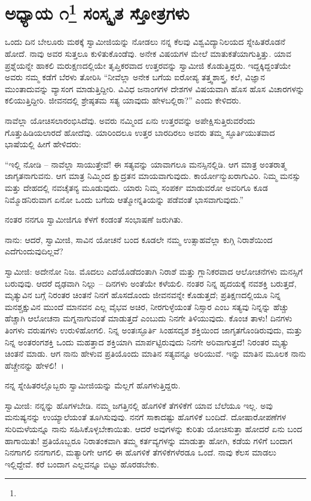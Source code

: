 
\chapter[ಅಧ್ಯಾಯ ೧]{ಅಧ್ಯಾಯ ೧\protect\footnote{} ಸಂಸ್ಕೃತ ಸ್ತೋತ್ರಗಳು}

ಒಂದು ದಿನ ಬೇಲೂರು ಮಠಕ್ಕೆ ಸ್ವಾಮೀಜಿಯನ್ನು ನೋಡಲು ನನ್ನ ಕೆಲವು ವಿಶ್ವವಿದ್ಯಾನಿಲಯದ ಸ್ನೇಹಿತರೊಡನೆ ಹೋದೆ. ನಾವು ಅವರ ಸುತ್ತಲೂ ಕುಳಿತುಕೊಂಡೆವು. ಅನೇಕ ವಿಷಯಗಳ ಮೇಲೆ ಮಾತುಕತೆಯಾಗುತ್ತಿತ್ತು. ಯಾವ ಪ್ರಶ್ನೆಯನ್ನೇ ಹಾಕಲಿ ಮರುಕ್ಷಣದಲ್ಲಿಯೇ ತೃಪ್ತಿಕರವಾದ ಉತ್ತರವನ್ನು ಸ್ವಾಮೀಜಿ ಕೊಡುತ್ತಿದ್ದರು. ಇದ್ದಕ್ಕಿದ್ದಂತೆಯೇ ಅವರು ನಮ್ಮ ಕಡೆಗೆ ಬೆರಳು ತೋರಿಸಿ “ನೀವೆಲ್ಲಾ ಅನೇಕ ಬಗೆಯ ಐರೋಪ್ಯ ತತ್ತ್ವಶಾಸ್ತ್ರ, ಕಲೆ, ವಿಜ್ಞಾನ ಮುಂತಾದುವನ್ನು ವ್ಯಾಸಂಗ ಮಾಡುತ್ತಿದ್ದೀರಿ. ವಿವಿಧ ಜನಾಂಗಗಳ ದೇಶಗಳ ವಿಷಯವಾಗಿ ಹೊಸ ಹೊಸ ವಿಚಾರಗಳನ್ನು ಕಲಿಯುತ್ತಿದ್ದೀರಿ. ಜೀವನದಲ್ಲಿ ಶ್ರೇಷ್ಠತಮ ಸತ್ಯ ಯಾವುದು ಹೇಳಬಲ್ಲಿರಾ?” ಎಂದು ಕೇಳಿದರು.

ನಾವೆಲ್ಲಾ ಯೋಚಿಸಲಾರಂಭಿಸಿದೆವು. ಅವರು ನಮ್ಮಿಂದ ಏನು ಉತ್ತರವನ್ನು ಅಪೇಕ್ಷಿಸುತ್ತಿರುವರೆಂದು ಗೊತ್ತುಹಿಡಿಯಲಾರದೆ ಹೋದೆವು. ಯಾರಿಂದಲೂ ಉತ್ತರ ಬಾರದಿರಲು ಅವರು ತಮ್ಮ ಸ್ಫೂರ್ತಿಯುತವಾದ ಭಾಷೆಯಲ್ಲಿ ಹೀಗೆ ಹೇಳಿದರು:

“ಇಲ್ಲಿ ನೋಡಿ – ನಾವೆಲ್ಲಾ ಸಾಯುತ್ತೇವೆ! ಈ ಸತ್ಯವನ್ನು ಯಾವಾಗಲೂ ಮನಸ್ಸಿನಲ್ಲಿಡಿ. ಆಗ ಮಾತ್ರ ಅಂತರಾತ್ಮ ಜಾಗೃತನಾಗುವನು. ಆಗ ಮಾತ್ರ ನಿಮ್ಮಿಂದ ಕ್ಷುದ್ರತನ ಮಾಯವಾಗುವುದು. ಕಾರ್ಯೋನ್ಮುಖರಾಗುವಿರಿ. ನಿಮ್ಮ ಮನಸ್ಸು ಮತ್ತು ದೇಹದಲ್ಲಿ ನವಚೈತನ್ಯ ಮೂಡುವುದು. ಯಾರು ನಿಮ್ಮ ಸಂಪರ್ಕ ಮಾಡುವರೋ ಅವರಿಗೂ ಕೂಡ ನಿಮ್ಮೊಡನಿರುವಾಗ ಏನೋ ಒಂದು ಬಗೆಯ ಆತ್ಮೋನ್ನತಿಯನ್ನು ಪಡೆವಂತೆ ಭಾಸವಾಗುವುದು.”

ನಂತರ ನನಗೂ ಸ್ವಾಮೀಜಿಗೂ ಕೆಳಗೆ ಕಂಡಂತೆ ಸಂಭಾಷಣೆ ಜರುಗಿತು.

ನಾನು: ಆದರೆ, ಸ್ವಾಮೀಜಿ, ಸಾವಿನ ಯೋಚನೆ ಬಂದ ಕೂಡಲೇ ನಮ್ಮ ಉತ್ಸಾಹವೆಲ್ಲಾ ಕುಗ್ಗಿ ನಿರಾಶೆಯಿಂದ ಎದೆಗುಂದುವುದಿಲ್ಲವೆ?

ಸ್ವಾಮೀಜಿ: ಅದೇನೋ ನಿಜ. ಮೊದಲು ಎದೆಯೊಡೆದಂತಾಗಿ ನಿರಾಶೆ ಮತ್ತು ಗ್ಲಾನಿಕರವಾದ ಆಲೋಚನೆಗಳು ಮನಸ್ಸಿಗೆ ಬರುವುವು. ಆದರೆ ದೃಢವಾಗಿ ನಿಲ್ಲು – ದಿನಗಳು ಅಂತೆಯೇ ಕಳೆಯಲಿ. ನಂತರ ನಿನ್ನ ಹೃದಯಕ್ಕೆ ನವಶಕ್ತಿ ಬರುತ್ತದೆ, ಮೃತ್ಯುವಿನ ಬಗ್ಗೆ ನಿರಂತರ ಚಿಂತನೆ ನಿನಗೆ ಹೊಸದೊಂದು ಜೀವನವನ್ನೇ ಕೊಡುತ್ತದೆ; ಪ್ರತಿಕ್ಷಣದಲ್ಲಿಯೂ ನಿನ್ನ ಮನಶ್ಚಕ್ಷುವಿನ ಮುಂದೆ ಮಾನವನ ಎಲ್ಲ ವೈಭವ ಅಚಿರ, ನೀರಗುಳ್ಳೆಯಂತೆ ನಿಸ್ಸಾರ ಎಂಬ ಸತ್ಯವು ನಿನ್ನನ್ನು ಹೆಚ್ಚು ಹೆಚ್ಚಾಗಿ ಆಲೋಚನಾ ಮಗ್ನನಾಗುವಂತೆ ಮಾಡುತ್ತದೆ ಎಂಬುದು ನಿನಗೇ ತಿಳಿಯುವುದು. ಕೊಂಚ ತಾಳು! ದಿನಗಳು ತಿಂಗಳು ವರುಷಗಳು ಉರುಳಿಹೋಗಲಿ. ನಿನ್ನ ಅಂತಃಸ್ಫೂರ್ತಿ ಸಿಂಹಸದೃಶ ಶಕ್ತಿಯಿಂದ ಜಾಗೃತಗೊಂಡಿರುವುದು, ಮತ್ತು ನಿನ್ನ ಅಂತರಂಗಶಕ್ತಿ ಒಂದು ಮಹತ್ತಾದ ಶಕ್ತಿಯಾಗಿ ಮಾರ್ಪಟ್ಟಿರುವುದು ನಿನಗೇ ಅರಿವಾಗುತ್ತದೆ! ನಿರಂತರ ಮೃತ್ಯು ಚಿಂತನೆ ಮಾಡು. ಆಗ ನಾನು ಹೇಳುವ ಪ್ರತಿಯೊಂದು ಮಾತಿನ ಸತ್ಯವನ್ನೂ ಅರಿಯುವೆ. ಇನ್ನು ಮಾತಿನ ಮೂಲಕ ನಾನು ಹೆಚ್ಚೇನನ್ನು ಹೇಳಲಿ!~।

ನನ್ನ ಸ್ನೇಹಿತರಲ್ಲೊಬ್ಬರು ಸ್ವಾಮೀಜಿಯನ್ನು ಮೆಲ್ಲಗೆ ಹೊಗಳುತ್ತಿದ್ದರು.

ಸ್ವಾಮೀಜಿ: ನನ್ನನ್ನು ಹೊಗಳಬೇಡಿ. ನಮ್ಮ ಜಗತ್ತಿನಲ್ಲಿ ಹೊಗಳಿಕೆ ತೆಗಳಿಕೆಗೆ ಯಾವ ಬೆಲೆಯೂ ಇಲ್ಲ. ಅವು ಮನುಷ್ಯನನ್ನು ಉಯ್ಯಾಲೆಯಂತೆ ತೂಗಿಸುವುವು. ನನಗೆ ಸಾಕಾದಷ್ಟು ಹೊಗಳಿಕೆ ಬಂದಿದೆ. ದೋಷಾರೋಪಣೆಗಳ ಸುರಿಮಳೆಯನ್ನೂ ನಾನು ಸಹಿಸಿಕೊಳ್ಳಬೇಕಾಯಿತು. ಆದರೆ ಅವುಗಳನ್ನು ಕುರಿತು ಯೋಚಿಸುತ್ತಾ ಹೋದರೆ ಏನು ಬಂದ ಹಾಗಾಯಿತು! ಪ್ರತಿಯೊಬ್ಬರೂ ನಿರಾತಂಕವಾಗಿ ತಮ್ಮ ಕರ್ತವ್ಯಗಳನ್ನು ಮಾಡುತ್ತಾ ಹೋಗಿ, ಕಡೆಯ ಗಳಿಗೆ ಬಂದಾಗ ನಿನಗಾಗಲಿ ನನಗಾಗಲಿ, ಮತ್ಯಾರಿಗೇ ಆಗಲಿ ಈ ಹೊಗಳಿಕೆ ತೆಗಳಿಕೆಗಳೆರಡೂ ಒಂದೆ. ನಾವು ಕೆಲಸ ಮಾಡಲು ಇಲ್ಲಿದ್ದೇವೆ. ಕರೆ ಬಂದಾಗ ಎಲ್ಲವನ್ನೂ ಬಿಟ್ಟು ಹೊರಡಬೇಕು.

